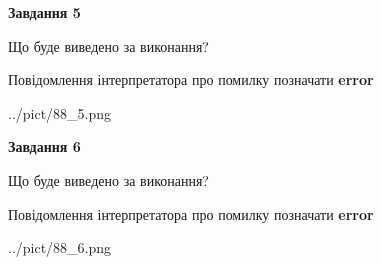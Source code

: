 \documentclass[12pt, ukrainian]{article}
\begin{document}
{{\begin {center}\textbf{Завдання 5}\end {center}}\par
Що буде виведено за виконання? \par
Повідомлення інтерпретатора про помилку позначати \textbf{error}

\begin{center}
	{../pict/88_5.png}
\end{center}
\newpage

{\begin {center}\textbf{Завдання 6}\end {center}}\par
Що буде виведено за виконання? \par
Повідомлення інтерпретатора про помилку позначати \textbf{error}

\begin{center}
	{../pict/88_6.png}
\end{center}
\newpage

}
\end{document}
